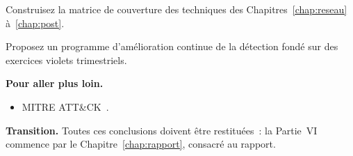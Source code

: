 \begin{boxexo}[title={\ding{45}\quad Exercice~21.9. Couverture complète \niveauexpert}]
Construisez la matrice de couverture des techniques des Chapitres~\ref{chap:reseau}
à~\ref{chap:post}.
\end{boxexo}

\begin{boxexo}[title={\ding{45}\quad Exercice~21.10. Programme \niveauexpert}]
Proposez un programme d'amélioration continue de la détection fondé sur des
exercices violets trimestriels.
\end{boxexo}

\bigskip

\begin{boxinfo}
\textbf{Pour aller plus loin.}
\begin{itemize}
    \item MITRE ATT\&CK~\cite{mitreattack}.
\end{itemize}
\end{boxinfo}

\begin{boxinfo}
\textbf{Transition.} Toutes ces conclusions doivent être restituées~: la
Partie~VI commence par le Chapitre~\ref{chap:rapport}, consacré au rapport.
\end{boxinfo}
